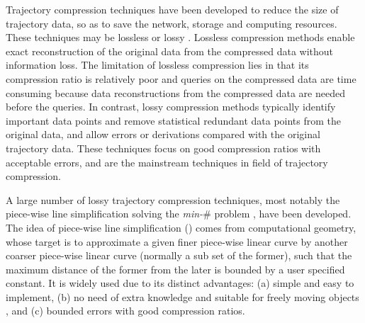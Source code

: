 Trajectory compression techniques \cite{Douglas:Peucker, Hershberger:Speeding, Meratnia:Spatiotemporal, Liu:BQS, Muckell:Compression, Chen:Trajectory, Chen:Fast, Keogh:online, Cao:Spatio, Shi:Survey, Richter:Semantic ,Long:Direction, Song:PRESS, Nibali:Trajic} have been developed to reduce the size of trajectory data, so as to save the network, storage and computing resources.
%
%
%
%
These techniques may be lossless or lossy \cite{Muckell:Compression}.
Lossless compression methods enable exact reconstruction of the original data from the compressed data without information loss. 
The limitation of lossless compression lies in that its compression ratio is relatively poor \cite{Nibali:Trajic} and {queries on the compressed data are time consuming because data reconstructions from the compressed data are needed before the queries}.
%
In contrast, lossy compression methods typically identify important data points and remove statistical redundant data points from the original data, and allow errors or derivations compared with the original trajectory data. 
These techniques focus on good compression ratios with acceptable errors, and are the mainstream techniques in field of trajectory compression.

A large number of lossy trajectory compression techniques, most notably the piece-wise line simplification \cite{Douglas:Peucker, Hershberger:Speeding, Keogh:online,Liu:BQS, Muckell:Compression, Chen:Trajectory, Chen:Fast, Cao:Spatio, Shi:Survey} solving the \emph{min-$\#$} problem \cite{Chan:Optimal, Imai:Optimal,Pavlidis:Segment}, have been developed. The idea of piece-wise line simplification (\lsa) comes from computational geometry, whose target is to approximate a given finer piece-wise linear curve by another coarser piece-wise linear curve ({normally} a sub set of the former), such that the maximum distance of the former from the later is bounded by a user specified constant. It is widely used due to its distinct advantages: (a) simple and easy to implement, (b) no need of extra knowledge and suitable for freely  moving  objects \cite{Popa:Spatio}, and (c) bounded errors with good compression ratios.

